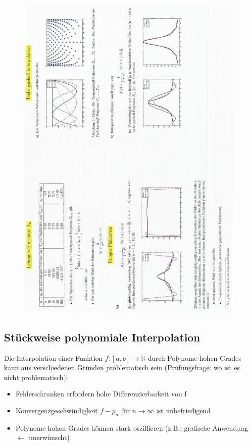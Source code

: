 \begin{figure}[htbp]
  \centering
  \includegraphics[width=\textwidth]{figures/handout_interpolation.png}
\end{figure}
\subsection{Stückweise polynomiale Interpolation}
Die Interpolation einer Funktion $f:[a,b] \longrightarrow \mathbb{R}$ durch Polynome hohen Grades
kann aus verschiedenen Gründen problematisch sein (Prüfungsfrage: wo ist es nicht problematisch):
\begin{itemize}
  \item Fehlerschranken erfordern hohe Differenzierbarkeit von f
  \item Konvergenzgeschwindigkeit $f-p_n$ für $n \rightarrow \infty$ ist unbefriedigend
  \item Polynome hohen Grades können stark oszillieren (z.B.: grafische Anwendung $\leftarrow$ unerwünscht)
\end{itemize}

